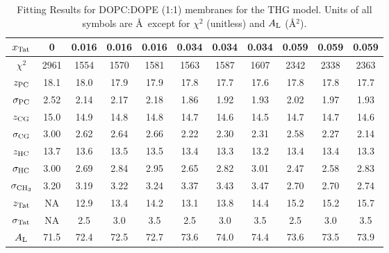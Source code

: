 \begin{table}[htbp]
  \centering
  \begin{tabular}{c|c|ccc|ccc|ccc}
    \hline
    $x_\textrm{Tat}$ & 0 & 0.016 & 0.016 & 0.016 & 0.034 & 0.034 & 0.034 & 0.059 & 0.059 & 0.059 \\
    \hline
    $\chi^2$ & 2961 & 1554 & 1570 & 1581 & 1563 & 1587 & 1607 & 2342 & 2338 & 2363 \\     
    $z_\textrm{PC}$ & 18.1 & 18.0 & 17.9 & 17.9 & 17.8 & 17.7 & 17.6 & 17.8 & 17.8 & 17.7 \\
    $\sigma_\textrm{PC}$ & 2.52 & 2.14 & 2.17 & 2.18 & 1.86 & 1.92 & 1.93 & 2.02 & 1.97 & 1.93 \\
    $z_\textrm{CG}$ & 15.0 & 14.9 & 14.8 & 14.8 & 14.7 & 14.6 & 14.5 & 14.7 & 14.7 & 14.6 \\
    $\sigma_\textrm{CG}$ & 3.00 & 2.62 & 2.64 & 2.66 & 2.22 & 2.30 & 2.31 & 2.58 & 2.27 & 2.14 \\
    $z_\textrm{HC}$ & 13.7 & 13.6 & 13.5 & 13.5 & 13.4 & 13.3 & 13.2 & 13.4 & 13.4 & 13.3 \\ 
    $\sigma_\textrm{HC}$ & 3.00 & 2.69 & 2.84 & 2.95 & 2.65 & 2.82 & 3.01 & 2.47 & 2.58 & 2.83 \\
    $\sigma_{\textrm{CH}_3}$ & 3.20 & 3.19 & 3.22 & 3.24 & 3.37 & 3.43 & 3.47 & 2.70 & 2.70 & 2.74 \\
    $z_\textrm{Tat}$ & NA & 12.9 & 13.4 & 14.2 & 13.1 & 13.8 & 14.4 & 15.2 & 15.2 & 15.7 \\
    $\sigma_\textrm{Tat}$ & NA & 2.5 & 3.0 & 3.5 & 2.5 & 3.0 & 3.5 & 2.5 & 3.0 & 3.5 \\ 
    $A_\textrm{L}$ & 71.5 & 72.4 & 72.5 & 72.7 & 73.6 & 74.0 & 74.4 & 73.6 & 73.5 & 73.9 \\
    \hline
  \end{tabular}
  \caption{Fitting Results for DOPC:DOPE (1:1) membranes for the THG model. 
  Units of all symbols are \AA\ except for $\chi^2$ (unitless) and $A_\textrm{L}$ (\AA$^2$).}
  \label{tab:DOPCDOPE1to1_fit_results}
\end{table}

